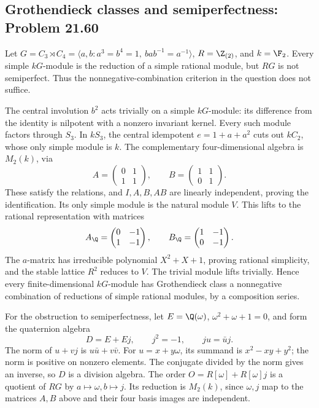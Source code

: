 \subsection{Grothendieck classes and semiperfectness: Problem 21.60}
\label{cand:21.60}

Let \(G=C_3\rtimes C_4=\langle a,b:a^3=b^4=1,\
bab^{-1}=a^{-1}\rangle\), \(R=\Z_{(2)}\), and
\(k=\F_2\). Every simple \(kG\)-module is the reduction
of a simple rational module, but \(RG\) is not
semiperfect. Thus the nonnegative-combination criterion
in the question does not suffice.

The central involution \(b^2\) acts trivially on a
simple \(kG\)-module: its difference from the identity
is nilpotent with a nonzero invariant kernel.
Every such module factors through \(S_3\). In \(kS_3\),
the central idempotent \(e=1+a+a^2\) cuts out \(kC_2\),
whose only simple module is \(k\). The complementary
four-dimensional algebra is \(M_2(k)\), via
\[
 A=\begin{pmatrix}0&1\\1&1\end{pmatrix},\qquad
 B=\begin{pmatrix}1&1\\0&1\end{pmatrix}.
\]
These satisfy the relations, and \(I,A,B,AB\) are
linearly independent, proving the identification.
Its only simple module is the natural module \(V\).
This lifts to the rational representation with matrices
\[
 A_{\Q}=\begin{pmatrix}0&-1\\1&-1\end{pmatrix},\qquad
 B_{\Q}=\begin{pmatrix}1&-1\\0&-1\end{pmatrix}.
\]
The \(a\)-matrix has irreducible polynomial
\(X^2+X+1\), proving rational simplicity, and the
stable lattice \(R^2\) reduces to \(V\).
The trivial module lifts trivially. Hence every
finite-dimensional \(kG\)-module has Grothendieck
class a nonnegative combination of reductions of
simple rational modules, by a composition series.

For the obstruction to semiperfectness, let
\(E=\Q(\omega)\), \(\omega^2+\omega+1=0\), and
form the quaternion algebra
\[
 D=E+Ej,\qquad j^2=-1,\qquad ju=\bar u j.
\]
The norm of \(u+vj\) is \(u\bar u+v\bar v\).
For \(u=x+y\omega\), its summand is
\(x^2-xy+y^2\); the norm is positive on nonzero
elements. The conjugate divided by the norm gives
an inverse, so \(D\) is a division algebra.
The order \(O=R[\omega]+R[\omega]j\) is a quotient
of \(RG\) by \(a\mapsto\omega,b\mapsto j\).
Its reduction is \(M_2(k)\), since \(\omega,j\)
map to the matrices \(A,B\) above and their four
basis images are independent.

